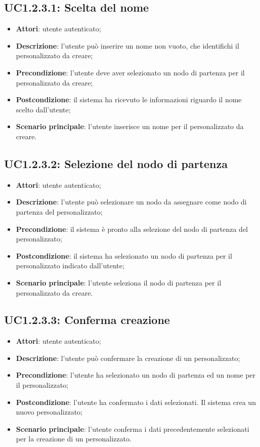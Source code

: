 \subsection{UC1.2.3.1: Scelta del nome}
\label{UC1.2.3.1}
\begin{itemize}
\item \textbf{Attori}: utente autenticato;
\item \textbf{Descrizione}: l'utente può inserire un nome non vuoto, che identifichi il  personalizzato da creare;
\item \textbf{Precondizione}: l'utente deve aver selezionato un nodo di partenza per il  personalizzato da creare;
\item \textbf{Postcondizione}: il sistema ha ricevuto le informazioni riguardo il nome scelto dall'utente;
\item \textbf{Scenario principale}:
l'utente inserisce un nome per il  personalizzato da creare.
\end{itemize}
\subsection{UC1.2.3.2: Selezione del nodo di partenza}
\label{UC1.2.3.2}
\begin{itemize}
\item \textbf{Attori}: utente autenticato;
\item \textbf{Descrizione}: l'utente può selezionare un nodo da assegnare come nodo di partenza del  personalizzato;
\item \textbf{Precondizione}: il sistema è pronto alla selezione del nodo di partenza del  personalizzato;
\item \textbf{Postcondizione}: il sistema ha selezionato un nodo di partenza per il  personalizzato indicato dall'utente;
\item \textbf{Scenario principale}:
l'utente seleziona il nodo di partenza per il  personalizzato da creare.
\end{itemize}
\subsection{UC1.2.3.3: Conferma creazione}
\label{UC1.2.3.3}
\begin{itemize}
\item \textbf{Attori}: utente autenticato;
\item \textbf{Descrizione}: l'utente può confermare la creazione di un  personalizzato;
\item \textbf{Precondizione}: l'utente ha selezionato un nodo di partenza ed un nome per il  personalizzato;
\item \textbf{Postcondizione}: l'utente ha confermato i dati selezionati. Il sistema crea un nuovo  personalizzato;
\item \textbf{Scenario principale}:
l'utente conferma i dati precedentemente selezionati per la creazione di un  personalizzato.
\end{itemize}
